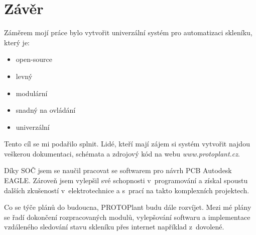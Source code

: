 \chapter*{Závěr}

Záměrem mojí práce bylo vytvořit univerzální systém pro automatizaci skleníku, který je:
\begin{itemize}
    \item open-source
    \item levný
    \item modulární
    \item snadný na ovládání
    \item univerzální
\end{itemize}

Tento cíl se mi podařilo splnit.
Lidé, kteří mají zájem si systém vytvořit najdou veškerou dokumentaci, schémata a zdrojový kód na webu \textit{www.protoplant.cz}.

Díky SOČ jsem se naučil pracovat se softwarem pro návrh PCB Autodesk EAGLE.
Zároveň jsem vylepšil své schopnosti v~programování a získal spoustu dalších zkušeností v~elektrotechnice a s~prací na takto komplexních projektech.

Co se týče plánů do budoucna, PROTOPlant budu dále rozvíjet.
Mezi mé plány se řadí dokončení rozpracovaných modulů, vylepšování softwaru a implementace vzdáleného sledování stavu skleníku přes internet například z~dovolené.

\newpage